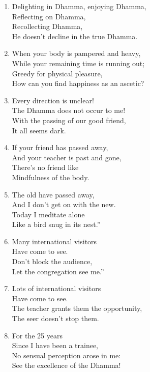 \documentclass[10pt, openany]{book}
\newcommand*{\vleftofline}[1]{\leavevmode\llap{#1}}
\begin{document}
\begin{enumerate}
\item Delighting in Dhamma, enjoying Dhamma,\\
Reflecting on Dhamma,\\
Recollecting Dhamma,\\
He doesn’t decline in the true Dhamma.

\item When your body is pampered and heavy,\\
While your remaining time is running out;\\
Greedy for physical pleasure,\\
How can you find happiness as an ascetic?

\item Every direction is unclear!\\
The Dhamma does not occur to me!\\
With the passing of our good friend,\\
It all seems dark.

\item If your friend has passed away,\\
And your teacher is past and gone,\\
There’s no friend like\\
Mindfulness of the body.

\item The old have passed away,\\
And I don’t get on with the new.\\
Today I meditate alone\\
Like a bird snug in its nest.”

\item \vleftofline{“}Many international visitors\\
Have come to see.\\
Don’t block the audience,\\
Let the congregation see me.”

\item \vleftofline{“}Lots of international visitors\\
Have come to see.\\
The teacher grants them the opportunity,\\
The seer doesn’t stop them.

\item For the 25 years\\
Since I have been a trainee,\\
No sensual perception arose in me:\\
See the excellence of the Dhamma!


\end{enumerate}
\end{document}
